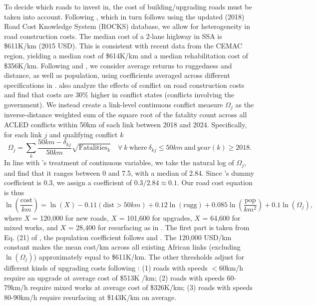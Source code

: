\documentclass[a4paper]{article}
\begin{document}
To decide which roads to invest in, the cost of building/upgrading roads must be taken into account. Following \citet{krantz2024optimal}, which in turn follows \citet{collier2016cost} using the updated (2018) Road Cost Knowledge System (ROCKS) database, we allow for heterogeneity in road construction costs. The median cost of a 2-lane highway in SSA is \$611K/km (2015 USD). This is consistent with recent data from the CEMAC region, yielding a median cost of \$614K/km and a median rehabilitation cost of \$356K/km. Following \citet{fajgelbaum2020optimal} and \citet{graff2024spatial}, we consider average returns to ruggedness and distance, as well as population, using coefficients averaged across different specifications in \citet{collier2016cost}. \citet{collier2016cost} also analyze the effects of conflict on road construction costs and find that costs are 30\% higher in conflict states (conflicts involving the government). We instead create a link-level continuous conflict measure $\Omega_j$ as the inverse-distance weighted sum of the square root of the fatality count across all ACLED conflicts within 50km of each link between 2018 and 2024. Specifically, for each link $j$ and qualifying conflict $k$
\begin{equation} \label{eq:conf}
\Omega_j = \sum_{k} \frac{50km-\delta_{kj}}{50km} \sqrt{\text{Fatalities}_k}\quad \forall\ k\ \text{where}\ \delta_{kj}\leq 50km\ \text{and}\  year(k)\geq 2018.
\end{equation}
In line with \citet{collier2016cost}'s treatment of continuous variables, we take the natural log of $\Omega_j$, and find that it ranges between 0 and 7.5, with a median of 2.84. Since \citet{collier2016cost}'s dummy coefficient is 0.3, we assign a coefficient of $0.3/2.84\approx 0.1$. Our road cost equation is thus
\begin{equation} \label{eq:COST}
\ln\left(\frac{\text{cost}}{km}\right) = \ln(X) -0.11 (\text{dist} > 50km) + 0.12 \ln(\text{rugg}) + 0.085 \ln\left(\frac{\text{pop}}{km^2}\right)+ 0.1 \ln(\Omega_j),
\end{equation}
where $X$ = 120,000 for new roads, $X$ = 101,600 for upgrades, $X$ = 64,600 for mixed works, and $X$ = 28,400 for resurfacing as in \citet{krantz2024optimal}. The first part is taken from Eq. (21) of \citet{fajgelbaum2020optimal}, the population coefficient follows \citet{collier2016cost} and \citet{krantz2024optimal}. The 120,000 USD/km constant makes the mean cost/km across all existing African links (excluding $\ln(\Omega_j)$) approximately equal to \$611K/km. The other thresholds adjust for different kinds of upgrading costs following \citet{krantz2024optimal}: (1) roads with speeds $<$60km/h require an upgrade at average cost of \$513K /km; (2) roads with speeds 60-79km/h require mixed works at average cost of \$326K/km; (3) roads with speeds 80-90km/h require resurfacing at \$143K/km on average. 
\end{document}
